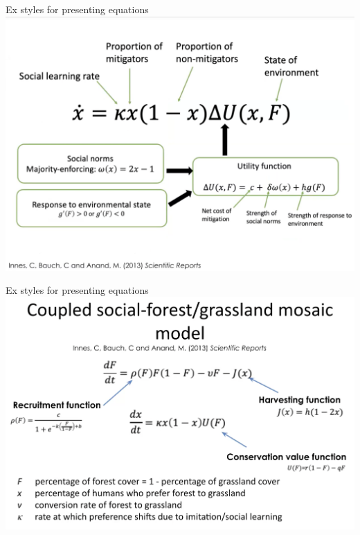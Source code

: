 \documentclass[notes=show]{beamer} %
\begin{document}
\begin{frame}{Ex styles for presenting equations}
\includegraphics[scale=.35]{fig/example_figures/eqn-ex-1.png}
\end{frame}%
\begin{frame}{Ex styles for presenting equations}
\includegraphics[scale=.35]{fig/example_figures/eqn-ex-2.png}
\end{frame}%
\end{document}

